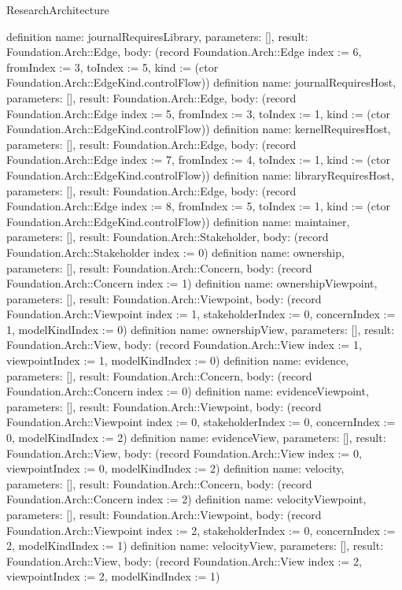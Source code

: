 \begin{lexlean}{ResearchArchitecture}
\begin{semanticmodule}
{}
definition{
 name: journalRequiresLibrary,
 parameters: [],
 result: Foundation.Arch::Edge,
 body: (record Foundation.Arch::Edge {index := 6, fromIndex := 3, toIndex := 5, kind := (ctor Foundation.Arch::EdgeKind.controlFlow)})
}
definition{
 name: journalRequiresHost,
 parameters: [],
 result: Foundation.Arch::Edge,
 body: (record Foundation.Arch::Edge {index := 5, fromIndex := 3, toIndex := 1, kind := (ctor Foundation.Arch::EdgeKind.controlFlow)})
}
definition{
 name: kernelRequiresHost,
 parameters: [],
 result: Foundation.Arch::Edge,
 body: (record Foundation.Arch::Edge {index := 7, fromIndex := 4, toIndex := 1, kind := (ctor Foundation.Arch::EdgeKind.controlFlow)})
}
definition{
 name: libraryRequiresHost,
 parameters: [],
 result: Foundation.Arch::Edge,
 body: (record Foundation.Arch::Edge {index := 8, fromIndex := 5, toIndex := 1, kind := (ctor Foundation.Arch::EdgeKind.controlFlow)})
}
definition{
 name: maintainer,
 parameters: [],
 result: Foundation.Arch::Stakeholder,
 body: (record Foundation.Arch::Stakeholder {index := 0})
}
definition{
 name: ownership,
 parameters: [],
 result: Foundation.Arch::Concern,
 body: (record Foundation.Arch::Concern {index := 1})
}
definition{
 name: ownershipViewpoint,
 parameters: [],
 result: Foundation.Arch::Viewpoint,
 body: (record Foundation.Arch::Viewpoint {index := 1, stakeholderIndex := 0, concernIndex := 1, modelKindIndex := 0})
}
definition{
 name: ownershipView,
 parameters: [],
 result: Foundation.Arch::View,
 body: (record Foundation.Arch::View {index := 1, viewpointIndex := 1, modelKindIndex := 0})
}
definition{
 name: evidence,
 parameters: [],
 result: Foundation.Arch::Concern,
 body: (record Foundation.Arch::Concern {index := 0})
}
definition{
 name: evidenceViewpoint,
 parameters: [],
 result: Foundation.Arch::Viewpoint,
 body: (record Foundation.Arch::Viewpoint {index := 0, stakeholderIndex := 0, concernIndex := 0, modelKindIndex := 2})
}
definition{
 name: evidenceView,
 parameters: [],
 result: Foundation.Arch::View,
 body: (record Foundation.Arch::View {index := 0, viewpointIndex := 0, modelKindIndex := 2})
}
definition{
 name: velocity,
 parameters: [],
 result: Foundation.Arch::Concern,
 body: (record Foundation.Arch::Concern {index := 2})
}
definition{
 name: velocityViewpoint,
 parameters: [],
 result: Foundation.Arch::Viewpoint,
 body: (record Foundation.Arch::Viewpoint {index := 2, stakeholderIndex := 0, concernIndex := 2, modelKindIndex := 1})
}
definition{
 name: velocityView,
 parameters: [],
 result: Foundation.Arch::View,
 body: (record Foundation.Arch::View {index := 2, viewpointIndex := 2, modelKindIndex := 1})
}
\end{semanticmodule}
\end{lexlean}
